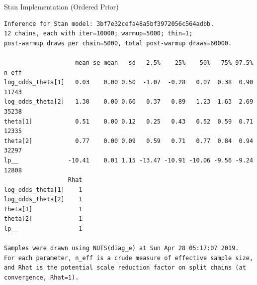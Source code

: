 \documentclass[dvipdfmx,bigger,aspectratio=169]{beamer}
\begin{document}
\begin{frame}[fragile,allowframebreaks,label=,t]{Stan Implementation (Ordered Prior)}
\normalsize
\scriptsize
\normalsize
\scriptsize
\begin{verbatim}
Inference for Stan model: 3bf7e32cefa48a5bf3972056c564adbb.
12 chains, each with iter=10000; warmup=5000; thin=1; 
post-warmup draws per chain=5000, total post-warmup draws=60000.

                    mean se_mean   sd   2.5%    25%    50%   75% 97.5% n_eff
log_odds_theta[1]   0.03    0.00 0.50  -1.07  -0.28   0.07  0.38  0.90 11743
log_odds_theta[2]   1.30    0.00 0.60   0.37   0.89   1.23  1.63  2.69 35238
theta[1]            0.51    0.00 0.12   0.25   0.43   0.52  0.59  0.71 12335
theta[2]            0.77    0.00 0.09   0.59   0.71   0.77  0.84  0.94 32297
lp__              -10.41    0.01 1.15 -13.47 -10.91 -10.06 -9.56 -9.24 12808
                  Rhat
log_odds_theta[1]    1
log_odds_theta[2]    1
theta[1]             1
theta[2]             1
lp__                 1

Samples were drawn using NUTS(diag_e) at Sun Apr 28 05:17:07 2019.
For each parameter, n_eff is a crude measure of effective sample size,
and Rhat is the potential scale reduction factor on split chains (at 
convergence, Rhat=1).
\end{verbatim}

\normalsize
\end{frame}
\end{document}

